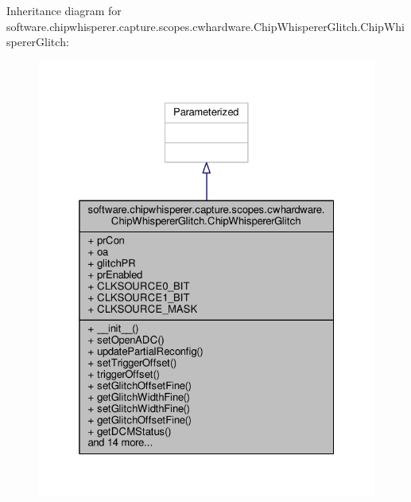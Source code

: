 Inheritance diagram for software.\+chipwhisperer.\+capture.\+scopes.\+cwhardware.\+Chip\+Whisperer\+Glitch.\+Chip\+Whisperer\+Glitch\+:\nopagebreak
\begin{figure}[H]
\begin{center}
\leavevmode
\includegraphics[width=325pt]{dd/d37/classsoftware_1_1chipwhisperer_1_1capture_1_1scopes_1_1cwhardware_1_1ChipWhispererGlitch_1_1ChipWhispererGlitch__inherit__graph}
\end{center}
\end{figure}



